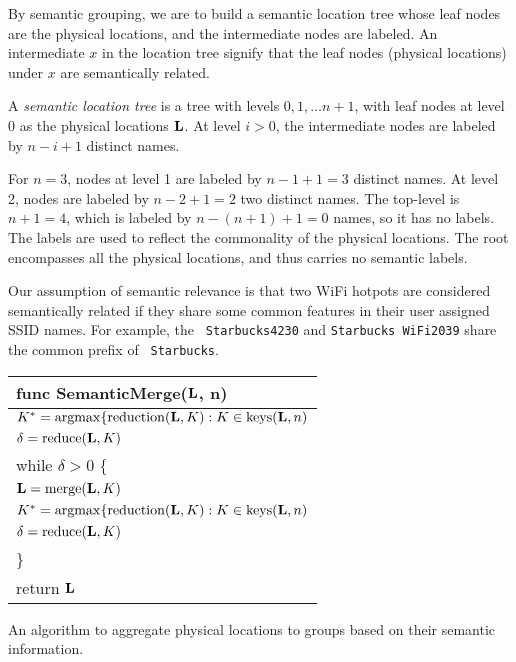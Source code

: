 By semantic grouping, we are to build a semantic location tree whose leaf nodes are the physical
locations, and the intermediate nodes are labeled.  An intermediate $x$ in the
location tree signify that the leaf nodes (physical locations) under $x$ are
semantically related.

\begin{definition}
    A {\em semantic location tree} is a tree with levels $0, 1, \dots n+1$, with leaf nodes at
    level 0 as the physical locations $\mathbf{L}$.  At level $i>0$, the intermediate
    nodes are labeled by $n-i+1$ distinct names.
\end{definition}

For $n=3$, nodes at level 1 are labeled by $n-1+1=3$ distinct names.  At level
2, nodes are labeled by $n-2+1=2$ two distinct names.  The top-level is $n+1=4$,
which is labeled by $n-(n+1)+1 = 0$ names, so it has no labels.
The labels are used to reflect the commonality of the physical locations.
The root encompasses all the physical locations, and thus carries no semantic
labels.

Our assumption of semantic relevance is that
two WiFi hotpots are considered semantically related if they share some common
features in their user assigned SSID names.  For example, the {\tt
Starbucks4230} and {\tt Starbucks WiFi2039} share the common prefix of {\tt
Starbucks}.  


\begin{algorithm}[t]
    \begin{tabular}{|l|} \hline
        func SemanticMerge($\mathbf{L}$, n) \\ \hline
        $K^* = \mathrm{argmax}\{
            \mathrm{reduction}(\mathbf{L}, K) : K\in\mathrm{keys}(\mathbf{L}, n)$\\
        $\delta = \mathrm{reduce}(\mathbf{L}, K)$ \\
        while $\delta > 0$ \{ \\
        \RRR $\mathbf{L} = \mathrm{merge}(\mathbf{L}, K)$ \\
        \RRR $K^* = \mathrm{argmax}\{
            \mathrm{reduction}(\mathbf{L}, K) : K\in\mathrm{keys}(\mathbf{L}, n)$\\
        \RRR $\delta = \mathrm{reduce}(\mathbf{L}, K)$ \\
        \}\\
        return $\mathbf{L}$ \\ \hline
    \end{tabular}
    \vspace{0.4cm}
    \caption{An algorithm to aggregate physical locations to groups based on
    their semantic information.}
    \label{alg:semantic}
\end{algorithm}

